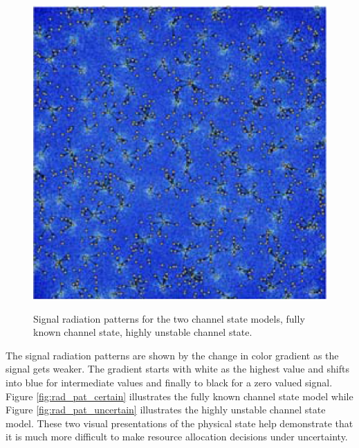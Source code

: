 \begin{figure} [ht]
{		\includegraphics[scale=0.45]{images/network_vis/rad_pat_uncertain.eps}
		\label{fig:rad_pat_uncertain}
	}
\caption{Signal radiation patterns for the two channel state models,  fully known channel state,  highly unstable channel state.}
\label{fig:rad_pat}
\end{figure}

The signal radiation patterns are shown by the change in color gradient as the signal gets weaker.  The gradient starts with white as the highest value and shifts into blue for intermediate values and finally to black for a zero valued signal.  Figure \ref{fig:rad_pat_certain} illustrates the fully known channel state model while Figure \ref{fig:rad_pat_uncertain} illustrates the highly unstable channel state model.  These two visual presentations of the physical state help demonstrate that it is much more difficult to make resource allocation decisions under uncertainty.

